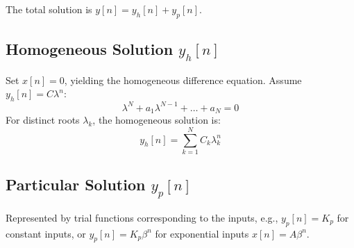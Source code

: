 \documentclass[11pt,a4paper]{article}
\begin{document}
The total solution is $y[n] = y_h[n] + y_p[n]$.

\subsection{Homogeneous Solution $y_h[n]$}
Set $x[n] = 0$, yielding the homogeneous difference equation. Assume $y_h[n] = C \lambda^n$:
\begin{equation}
\lambda^N + a_1\lambda^{N-1} + \dots + a_N = 0
\end{equation}
For distinct roots $\lambda_k$, the homogeneous solution is:
\begin{equation}
y_h[n] = \sum_{k=1}^{N} C_k \lambda_k^n
\end{equation}

\subsection{Particular Solution $y_p[n]$}
Represented by trial functions corresponding to the inputs, e.g., $y_p[n] = K_p$ for constant inputs, or $y_p[n] = K_p \beta^n$ for exponential inputs $x[n] = A \beta^n$.
\end{document}
